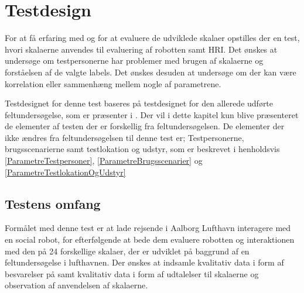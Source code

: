\chapter{Testdesign}
\label{TestAfSkalaTestdesign}
%
For at få erfaring med og for at evaluere de udviklede skalaer opstilles der en test, hvori skalaerne anvendes til evaluering af robotten samt HRI. \blankline
%
Det ønskes at undersøge om testpersonerne har problemer med brugen af skalaerne og forståelsen af de valgte labels. Det ønskes desuden at undersøge om der kan være korrelation eller sammenhæng mellem nogle af parametrene. \blankline

Testdesignet for denne test baseres på testdesignet for den allerede udførte feltundersøgelse, som er præsenter i . Der vil i dette kapitel kun blive præsenteret de elementer af testen der er forskellig fra feltundersøgelsen. De elementer der ikke ændres fra feltundersøgelsen til denne test er; Testpersonerne, brugsscenarierne samt testlokation og udstyr, som er beskrevet i henholdsvis \autoref{ParametreTestpersoner}, \autoref{ParametreBrugsscenarier} og \autoref{ParametreTestlokationOgUdstyr} 
%
\section{Testens omfang}
\label{TestAfSkalaTestensOmfang}
%
Formålet med denne test er at lade rejsende i Aalborg Lufthavn interagere med en social robot, for efterfølgende at bede dem evaluere robotten og interaktionen med den på 24 forskellige skalaer, der er udviklet på baggrund af en feltundersøgelse i lufthavnen. Der ønskes at indsamle kvalitativ data i form af besvarelser på samt kvalitativ data i form af udtalelser til skalaerne og observation af anvendelsen af skalaerne. 